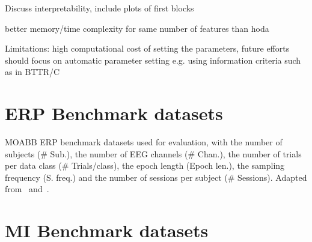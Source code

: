 \documentclass[twocolumn]{article}
\begin{document}
Discuss interpretability, include plots of first blocks

better memory/time complexity for same number of features than hoda

Limitations: high computational cost of setting the parameters, future efforts
should focus on automatic parameter setting e.g. using information criteria
such as in BTTR/C


\printbibliography

\clearpage
\appendix

\onecolumn
\section{ERP Benchmark datasets}
\begin{table*}[htp]
  
  \caption{MOABB ERP benchmark datasets used for evaluation, with the number of
  subjects (\# Sub.), the number of EEG channels (\# Chan.), the number of trials
per data class (\# Trials/class), the epoch length (Epoch len.), the sampling
frequency (S. freq.) and the number of sessions per subject (\# Sessions).
Adapted from~\cite{Aristimunha2023} and~\cite{Chevallier2024}.}
  \label{tab:moabb-erp}
\end{table*}
\section{MI Benchmark datasets}
\end{document}

